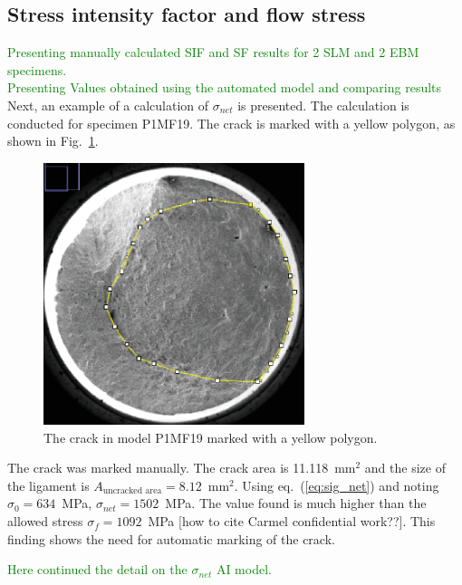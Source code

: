 \documentclass[preprint,12pt]{elsarticle}
\begin{document}
\subsection{Stress intensity factor and flow stress}
\label{Subsec: Stress intensity factor and flow stress}
\label{Subsec: Stress intensity factor and flow stress}
\textcolor{green}{Presenting manually calculated SIF and SF results for 2 SLM and 2 EBM specimens.\\Presenting Values obtained using the automated model and comparing results }
Next, an example of a calculation of $\sigma_{net}$ is presented.
The calculation is conducted for specimen P1MF19.
The crack is marked with a yellow polygon, as shown in Fig.~\ref{fig:P1MF19}.
%
\begin{figure}[t!]
  \begin{center}
  \includegraphics[width=3in]{P1MF19.eps}
  \caption{The crack in model P1MF19 marked with a yellow polygon.}
  \label{fig:P1MF19}
   \end{center}
\end{figure}
%
The crack was marked manually.
The crack area is 11.118~mm$^2$ and the size of the ligament is $A_{\mbox{uncracked area}}=8.12$~mm$^2$.
Using eq.~(\ref{eq:sig_net}) and noting $\sigma_0=634$~MPa,
                           $\sigma_{net}=1502$~MPa.
The value found is much higher than the allowed stress $\sigma_f=1092$~MPa [how to cite Carmel confidential work??].
This finding shows the need for automatic marking of the crack.


%
%
\textcolor{green}{Here continued the detail on the $\sigma_{net}$ AI model.}

\end{document}
